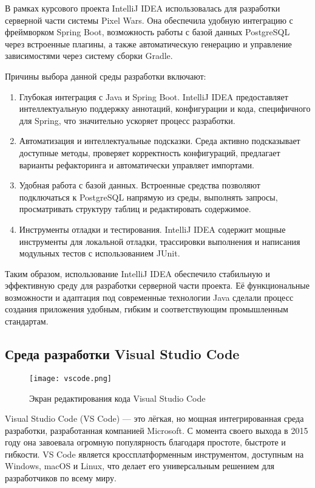 В рамках курсового проекта IntelliJ IDEA использовалась для разработки серверной части системы Pixel Wars. Она обеспечила удобную интеграцию с фреймворком Spring Boot, возможность работы с базой данных PostgreSQL через встроенные плагины, а также автоматическую генерацию и управление зависимостями через систему сборки Gradle.

Причины выбора данной среды разработки включают:
\begin{enumerate}
    \item
          Глубокая интеграция с Java и Spring Boot. IntelliJ IDEA предоставляет интеллектуальную поддержку аннотаций, конфигурации и кода, специфичного для Spring, что значительно ускоряет процесс разработки.
    \item
          Автоматизация и интеллектуальные подсказки. Среда активно подсказывает доступные методы, проверяет корректность конфигураций, предлагает варианты рефакторинга и автоматически управляет импортами.
    \item
          Удобная работа с базой данных. Встроенные средства позволяют подключаться к PostgreSQL напрямую из среды, выполнять запросы, просматривать структуру таблиц и редактировать содержимое.
    \item
          Инструменты отладки и тестирования. IntelliJ IDEA содержит мощные инструменты для локальной отладки, трассировки выполнения и написания модульных тестов с использованием JUnit.
\end{enumerate}

Таким образом, использование IntelliJ IDEA обеспечило стабильную и эффективную среду для разработки серверной части проекта. Её функциональные возможности и адаптация под современные технологии Java сделали процесс создания приложения удобным, гибким и соответствующим промышленным стандартам.

\subsection{Среда разработки Visual Studio Code}

\begin{figure}[H]
    \texttt{[image: vscode.png]}
    \caption{Экран редактирования кода Visual Studio Code}
\end{figure}

Visual Studio Code (VS Code) — это лёгкая, но мощная интегрированная среда разработки, разработанная компанией Microsoft. С момента своего выхода в 2015 году она завоевала огромную популярность благодаря простоте, быстроте и гибкости. VS Code является кроссплатформенным инструментом, доступным на Windows, macOS и Linux, что делает его универсальным решением для разработчиков по всему миру. \cite{vscode}

